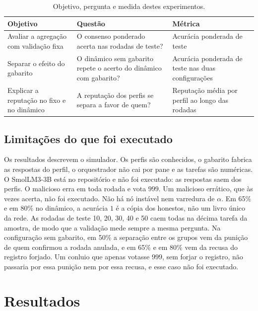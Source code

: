 \documentclass[12pt]{article}
\begin{document}
\begin{table}[htbp]
\centering
\caption{Objetivo, pergunta e medida destes experimentos.}
\label{tab:gqm}
\footnotesize
\begin{tabular}{|L{3.2cm}|L{5.0cm}|L{4.0cm}|}
\hline
\textbf{Objetivo} & \textbf{Questão} & \textbf{Métrica} \\
\hline
Avaliar a agregação com validação fixa &
O consenso ponderado acerta nas rodadas de teste? &
Acurácia ponderada de teste \\
\hline
Separar o efeito do gabarito &
O dinâmico sem gabarito repete o acerto do dinâmico com gabarito? &
Acurácia ponderada de teste nas duas configurações \\
\hline
Explicar a reputação no fixo e no dinâmico &
A reputação dos perfis se separa a favor de quem? &
Reputação média por perfil ao longo das rodadas \\
\hline
\end{tabular}
\end{table}

\subsection{Limitações do que foi executado}

Os resultados descrevem o simulador. Os perfis são conhecidos, o gabarito fabrica as respostas do perfil, o orquestrador não cai por pane e as tarefas são numéricas. O SmolLM3-3B está no repositório e não foi executado: as respostas saem dos perfis. O malicioso erra em toda rodada e vota $999$. Um malicioso errático, que às vezes acerta, não foi executado. Não há nó instável nem varredura de $\alpha$. Em 65\% e em 80\% no dinâmico, a acurácia $1$ é a cópia dos honestos, não um livro único da rede. As rodadas de teste 10, 20, 30, 40 e 50 caem todas na décima tarefa da amostra, de modo que a validação mede sempre a mesma pergunta. Na configuração sem gabarito, em 50\% a separação entre os grupos vem da punição de quem confirmou a rodada anulada, e em 65\% e em 80\% vem da recusa do registro forjado. Um conluio que apenas votasse $999$, sem forjar o registro, não passaria por essa punição nem por essa recusa, e esse caso não foi executado.

\section{Resultados}
\label{sec:resultados}
\end{document}
